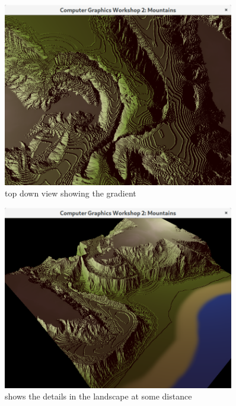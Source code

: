 \documentclass[a4paper, 11pt]{article} %
\begin{document}
\begin{figure}[ht]
\caption{top down view showing the gradient}
\centering
\includegraphics[width=0.9\textwidth]{down_view}
\end{figure}



\begin{figure}[ht]
\caption{shows the details in the landscape at some distance}
\centering
\includegraphics[width=0.9\textwidth]{landscape}
\end{figure}
\end{document}
